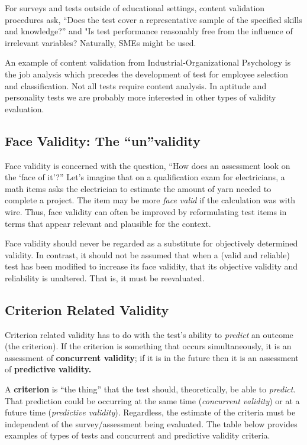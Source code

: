 \documentclass[
  english,
]{book}
\begin{document}
For surveys and tests outside of educational settings, content validation procedures ask, ``Does the test cover a representative sample of the specified skills and knowledge?'' and "Is test performance reasonably free from the influence of irrelevant variables? Naturally, SMEs might be used.

An example of content validation from Industrial-Organizational Psychology is the job analysis which precedes the development of test for employee selection and classification.
Not all tests require content analysis. In aptitude and personality tests we are probably more interested in other types of validity evaluation.

\hypertarget{face-validity-the-unvalidity}{%
\subsection{Face Validity: The ``un''validity}\label{face-validity-the-unvalidity}}

Face validity is concerned with the question, ``How does an assessment look on the `face of it'?'' Let's imagine that on a qualification exam for electricians, a math items asks the electrician to estimate the amount of yarn needed to complete a project. The item may be more \emph{face valid} if the calculation was with wire. Thus, face validity can often be improved by reformulating test items in terms that appear relevant and plausible for the context.

Face validity should never be regarded as a substitute for objectively determined validity. In contrast, it should not be assumed that when a (valid and reliable) test has been modified to increase its face validity, that its objective validity and reliability is unaltered. That is, it must be reevaluated.

\hypertarget{criterion-related-validity}{%
\subsection{Criterion Related Validity}\label{criterion-related-validity}}

Criterion related validity has to do with the test's ability to \emph{predict} an outcome (the criterion). If the criterion is something that occurs simultaneously, it is an assessment of \textbf{concurrent validity}; if it is in the future then it is an assessment of \textbf{predictive validity.}

A \textbf{criterion} is ``the thing'' that the test should, theoretically, be able to \emph{predict}. That prediction could be occurring at the same time (\emph{concurrent validity}) or at a future time (\emph{predictive validity}). Regardless, the estimate of the criteria must be independent of the survey/assessment being evaluated. The table below provides examples of types of tests and concurrent and predictive validity criteria.
\end{document}
